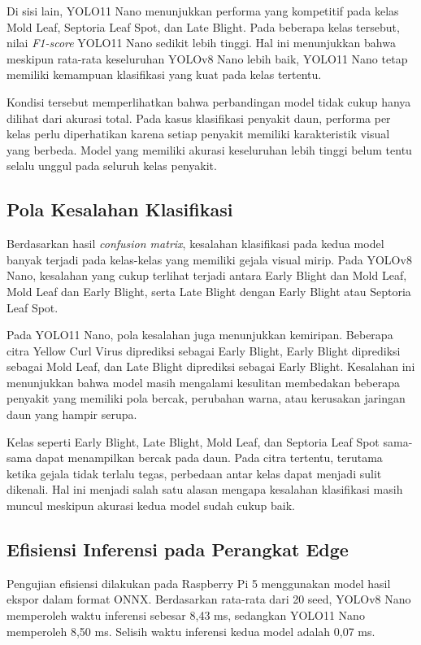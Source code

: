 \begin{sectioncontent}
\begin{subsectioncontent}
        Di sisi lain, YOLO11 Nano menunjukkan performa yang kompetitif pada kelas Mold Leaf, Septoria Leaf Spot, dan Late Blight. Pada beberapa kelas tersebut, nilai \textit{F1-score} YOLO11 Nano sedikit lebih tinggi. Hal ini menunjukkan bahwa meskipun rata-rata keseluruhan YOLOv8 Nano lebih baik, YOLO11 Nano tetap memiliki kemampuan klasifikasi yang kuat pada kelas tertentu.

        Kondisi tersebut memperlihatkan bahwa perbandingan model tidak cukup hanya dilihat dari akurasi total. Pada kasus klasifikasi penyakit daun, performa per kelas perlu diperhatikan karena setiap penyakit memiliki karakteristik visual yang berbeda. Model yang memiliki akurasi keseluruhan lebih tinggi belum tentu selalu unggul pada seluruh kelas penyakit.
    \end{subsectioncontent}

    \subsection{Pola Kesalahan Klasifikasi}
    \begin{subsectioncontent}
        \hspace{\parindent}Berdasarkan hasil \textit{confusion matrix}, kesalahan klasifikasi pada kedua model banyak terjadi pada kelas-kelas yang memiliki gejala visual mirip. Pada YOLOv8 Nano, kesalahan yang cukup terlihat terjadi antara Early Blight dan Mold Leaf, Mold Leaf dan Early Blight, serta Late Blight dengan Early Blight atau Septoria Leaf Spot.

        Pada YOLO11 Nano, pola kesalahan juga menunjukkan kemiripan. Beberapa citra Yellow Curl Virus diprediksi sebagai Early Blight, Early Blight diprediksi sebagai Mold Leaf, dan Late Blight diprediksi sebagai Early Blight. Kesalahan ini menunjukkan bahwa model masih mengalami kesulitan membedakan beberapa penyakit yang memiliki pola bercak, perubahan warna, atau kerusakan jaringan daun yang hampir serupa.

        Kelas seperti Early Blight, Late Blight, Mold Leaf, dan Septoria Leaf Spot sama-sama dapat menampilkan bercak pada daun. Pada citra tertentu, terutama ketika gejala tidak terlalu tegas, perbedaan antar kelas dapat menjadi sulit dikenali. Hal ini menjadi salah satu alasan mengapa kesalahan klasifikasi masih muncul meskipun akurasi kedua model sudah cukup baik.
    \end{subsectioncontent}

    \subsection{Efisiensi Inferensi pada Perangkat Edge}
    \begin{subsectioncontent}
        \hspace{\parindent}Pengujian efisiensi dilakukan pada Raspberry Pi 5 menggunakan model hasil ekspor dalam format ONNX. Berdasarkan rata-rata dari 20 seed, YOLOv8 Nano memperoleh waktu inferensi sebesar 8,43 ms, sedangkan YOLO11 Nano memperoleh 8,50 ms. Selisih waktu inferensi kedua model adalah 0,07 ms.


\end{subsectioncontent}
\end{sectioncontent}
